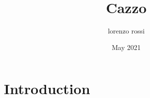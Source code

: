 \documentclass{article}
\title{Cazzo}
\author{lorenzo rossi}
\date{May 2021}
\begin{document}
\maketitle

\section{Introduction}
\end{document}
